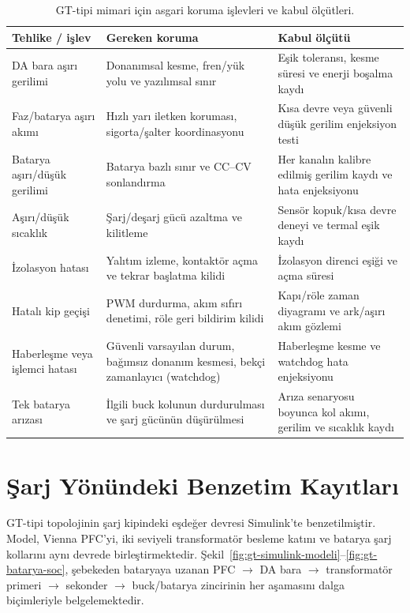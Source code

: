 \begin{table}[H]
  \centering
  \caption{GT-tipi mimari için asgari koruma işlevleri ve kabul ölçütleri.}
  \label{tab:gt-koruma-dogrulama}
  \small
  \begin{tabularx}{\textwidth}{@{}L{0.20\textwidth}L{0.33\textwidth}>{\teksatir\raggedright\arraybackslash}X@{}}
    \toprule
    Tehlike / işlev & Gereken koruma & Kabul ölçütü \\
    \midrule
    DA bara aşırı gerilimi & Donanımsal kesme, fren/yük yolu ve yazılımsal sınır & Eşik toleransı, kesme süresi ve enerji boşalma kaydı \\
    Faz/batarya aşırı akımı & Hızlı yarı iletken koruması, sigorta/şalter koordinasyonu & Kısa devre veya güvenli düşük gerilim enjeksiyon testi \\
    Batarya aşırı/düşük gerilimi & Batarya bazlı sınır ve CC--CV sonlandırma & Her kanalın kalibre edilmiş gerilim kaydı ve hata enjeksiyonu \\
    Aşırı/düşük sıcaklık & Şarj/deşarj gücü azaltma ve kilitleme & Sensör kopuk/kısa devre deneyi ve termal eşik kaydı \\
    İzolasyon hatası & Yalıtım izleme, kontaktör açma ve tekrar başlatma kilidi & İzolasyon direnci eşiği ve açma süresi \\
    Hatalı kip geçişi & PWM durdurma, akım sıfırı denetimi, röle geri bildirim kilidi & Kapı/röle zaman diyagramı ve ark/aşırı akım gözlemi \\
    Haberleşme veya işlemci hatası & Güvenli varsayılan durum, bağımsız donanım kesmesi, bekçi zamanlayıcı (watchdog) & Haberleşme kesme ve watchdog hata enjeksiyonu \\
    Tek batarya arızası & İlgili buck kolunun durdurulması ve şarj gücünün düşürülmesi & Arıza senaryosu boyunca kol akımı, gerilim ve sıcaklık kaydı \\
    \bottomrule
  \end{tabularx}
\end{table}

\section{Şarj Yönündeki Benzetim Kayıtları}
\label{sec:gt-benzetim}

GT-tipi topolojinin şarj kipindeki eşdeğer devresi Simulink'te benzetilmiştir. Model, Vienna PFC'yi, iki seviyeli transformatör besleme katını ve batarya şarj kollarını aynı devrede birleştirmektedir. Şekil~\ref{fig:gt-simulink-modeli}--\ref{fig:gt-batarya-soc}, şebekeden bataryaya uzanan PFC $\rightarrow$ DA bara $\rightarrow$ transformatör primeri $\rightarrow$ sekonder $\rightarrow$ buck/batarya zincirinin her aşamasını dalga biçimleriyle belgelemektedir.

